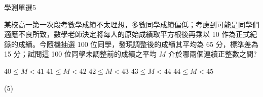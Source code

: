     \begin{QUESTION}
        \begin{ExamInfo}{94}{學測}{單選}{5}
        \end{ExamInfo}
        \begin{ExamAnsRateInfo}{8}{10}{7}{7}
        \end{ExamAnsRateInfo}
        \begin{QBODY}
            某校高一第一次段考數學成績不太理想，多數同學成績偏低；考慮到可能是同學們適應不良所致，數學老師決定將每人的原始成績取平方根後再乘以 10 作為正式紀錄的成績。今隨機抽選 100 位同學，發現調整後的成績其平均為 65 分，標準差為 15 分；試問這 100 位同學未調整前的成績之平均 $M$ 介於哪兩個連續正整數之間? 
			\begin{QOPS} 
				\QOP $40 \leq M <41$ 
				\QOP $41\leq  M<42$ 
				\QOP$ 42 \leq M<43$        
				\QOP $43 \leq M<44$        
				\QOP $44\leq  M<45$
			\end{QOPS}
        \end{QBODY}
        \begin{QFROMS}
        \end{QFROMS}
        \begin{QTAGS}\end{QTAGS}
        \begin{QANS}
            (5)
        \end{QANS}
        \begin{QSOLLIST}
        \end{QSOLLIST}
        \begin{QEMPTYSPACE}
        \end{QEMPTYSPACE}
    \end{QUESTION}
